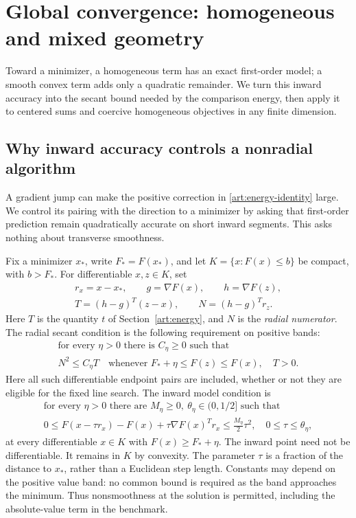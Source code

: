 \section{Global convergence: homogeneous and mixed geometry}\label{art:global}

Toward a minimizer, a homogeneous term has an exact first-order model;
a smooth convex term adds only a quadratic remainder. We turn this inward
accuracy into the secant bound needed by the comparison energy, then apply
it to centered sums and coercive homogeneous objectives in any finite
dimension.

\subsection{Why inward accuracy controls a nonradial algorithm}

A gradient jump can make the positive correction in
\eqref{art:energy-identity} large. We control its pairing with the direction
to a minimizer by asking that first-order prediction remain quadratically
accurate on short inward segments. This asks nothing about transverse
smoothness.

Fix a minimizer $x_*$, write $F_*=F(x_*)$, and let
$K=\{x:F(x)\le b\}$ be compact, with $b>F_*$. For differentiable $x,z\in K$,
set
\[
 \begin{gathered}
 r_x=x-x_*,\qquad g=\nabla F(x),\qquad h=\nabla F(z),\\
 T=(h-g)^T(z-x),\qquad N=(h-g)^Tr_z.
 \end{gathered}
\]
Here $T$ is the quantity $t$ of Section~\ref{art:energy}, and $N$ is the
\emph{radial numerator}.
The radial secant condition is the following requirement on positive bands:
\begin{equation}\label{art:radial-condition}
 \begin{gathered}
 \text{for every }\eta>0\text{ there is }C_\eta\ge0\text{ such that}\\
 N^2\le C_\eta T
 \quad\text{whenever }F_*+\eta\le F(z)\le F(x),\quad T>0.
 \end{gathered}
\end{equation}
Here all such differentiable endpoint pairs are included, whether or not they
are eligible for the fixed line search. The inward model condition is
\begin{equation}\label{art:inward-condition}
 \begin{gathered}
 \text{for every }\eta>0\text{ there are }M_\eta\ge0,
       \ \theta_\eta\in(0,1/2]\text{ such that}\\
 0\le F(x-\tau r_x)-F(x)+\tau\nabla F(x)^Tr_x
       \le\frac{M_\eta}{2}\tau^2,\quad 0\le\tau\le\theta_\eta,
 \end{gathered}
\end{equation}
at every differentiable $x\in K$ with $F(x)\ge F_*+\eta$.
The inward point need not be differentiable. It remains in $K$ by convexity.
The parameter $\tau$ is a fraction of the distance to $x_*$, rather than a
Euclidean step length. Constants may depend on the positive value band:
no common bound is required as the band approaches the minimum. Thus
nonsmoothness at the solution is permitted, including the absolute-value
term in the benchmark.

